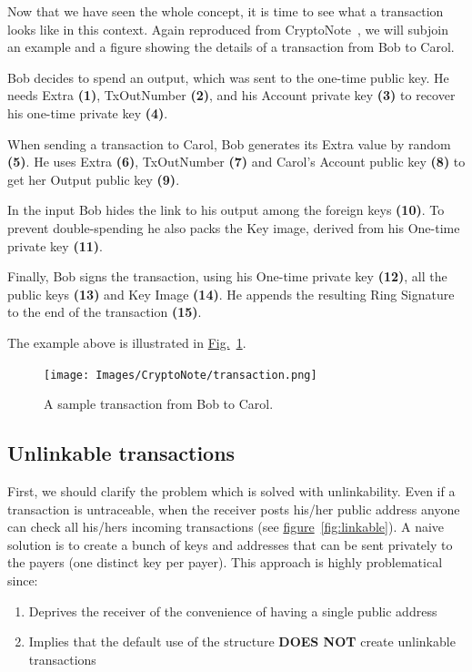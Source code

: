 Now that we have seen the whole concept, it is time to see what a transaction looks like in this context. Again reproduced from CryptoNote~\cite{cryptonote}, we will subjoin an example and a figure showing the details of a transaction from Bob to Carol.

Bob decides to spend an output, which was sent to the one-time public key. He needs Extra \textbf{(1)}, TxOutNumber \textbf{(2)}, and his Account private key \textbf{(3)} to recover his one-time private key \textbf{(4)}.

When sending a transaction to Carol, Bob generates its Extra value by random \textbf{(5)}. He uses Extra \textbf{(6)}, TxOutNumber \textbf{(7)} and Carol's Account public key \textbf{(8)} to get her Output public key \textbf{(9)}.

In the input Bob hides the link to his output among the foreign keys \textbf{(10)}. To prevent double-spending he also packs the Key image, derived from his One-time private key \textbf{(11)}.

Finally, Bob signs the transaction, using his One-time private key \textbf{(12)}, all the public keys \textbf{(13)} and Key Image \textbf{(14)}. He appends the resulting Ring Signature to the end of the transaction \textbf{(15)}.

The example above is illustrated in \hyperref[fig:transaction]{Fig.}~\ref{fig:transaction}.\\
\begin{figure}[ht]
  \centering
  \texttt{[image: Images/CryptoNote/transaction.png]}
  \caption{A sample transaction from Bob to Carol.}
  \label{fig:transaction}
\end{figure}
%
\subsection{Unlinkable transactions}
First, we should clarify the problem which is solved with unlinkability. Even if a transaction is untraceable, when the receiver posts his/her public address anyone can check all his/hers incoming transactions (see \hyperref[fig:linkable]{figure}~\ref{fig:linkable}). A naive solution is to create a bunch of keys and addresses that can be sent privately to the payers (one distinct key per payer). This approach is highly problematical since:
\begin{enumerate}[label=\alph*)]
  \item Deprives the receiver of the convenience of having a single public address
  \item Implies that the default use of the structure \textbf{DOES NOT} create unlinkable transactions
\end{enumerate}

